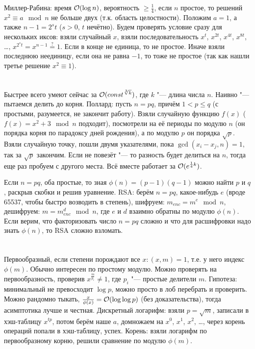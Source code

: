 Миллер-Рабина: время $\mathcal{O}(\log n)$, вероятность $\ge \frac 14$, если $n$ простое, то решений $x^2 \equiv a \mod n$ не больше двух (т.к. область целостности).
Положим $a=1$, а также $n-1 = 2^st$ ($s>0$, $t$ нечётно).
Будем проверять условие сразу для нескольких иксов: взяли случайный $x$, взяли последовательность $x^t$, $x^{2t}$, $x^{4t}$, $x^{8t}$, \dots, $x^{2^st}=x^{n-1}\stackrel{?}{=}1$.
Если в конце не единица, то не простое.
Иначе взяли последнюю неединицу, если она не равна $-1$, то тоже не простое (так как нашли третье решение $x^2\equiv 1$).

\section{} %
Быстрее всего умеют сейчас за $\mathcal{O}(const ^{\sqrt[3]{k}})$, где $k$ "--- длина числа $n$.
Наивно "--- пытаемся делить до корня.
Поллард: пусть $n=pq$, причём $1 < p \le q$ (с простыми, разумеется, не закончит работу).
Взяли случайную функцию $f(x)$ ($f(x)=x^2+3\mod n$ подходит), посмотрели на её периоды по модулю $n$ (он порядка корня по парадоксу дней рождения),
а по модулю $p$ он порядка $\sqrt p$.
Взяли случайную точку, пошли двумя указателями, пока $\gcd(x_i - x_j, n) = 1$, так за $\sqrt p$ закончим.
Если не повезёт "--- то разность будет делиться на $n$, тогда еще раз пробуем с другого места.
Всё вместе работает за $\mathcal{O}(e^{\frac14k})$.

Если $n=pq$, оба простые, то зная $\phi(n)=(p-1)(q-1)$ можно найти $p$ и $q$, раскрыв скобки и решив уравнение.
RSA: берём $n=pq$, какое-нибудь $e$ (вроде 65537, чтобы быстро возводить в степень), шифруем: $m_{enc}=m^e \mod n$,
дешифруем: $m=m_{enc}^d \mod n$, где $e$ и $d$ взаимно обратны по модулю $\phi(n)$.
Если верим, что факторизовать число $n=pq$ сложно и что для расшифровки надо знать $\phi(n)$, то RSA сложно взломать.

\section{} %
Первообразный, если степени порождают все $x \colon (x,m)=1$, т.е. у него индекс $\phi(m)$.
Обычно интересен по простому модулю.
Можно проверять на первообразность, проверив $x^{\frac{m}{p_i}} \neq 1$, где $p_i$ "--- простые делители $m$.
Гипотеза: минимальный не превосходит $\log p$, можно просто в лоб перебрать и проверить.
Можно рандомно тыкать, $\frac{x}{\phi(x)} = \mathcal{O}(\log \log p)$ (без доказательства), тогда асимптотика лучше и честная.
Дискретный логарифм: взяли $p=\sqrt m$, записали в хэш-таблицу $x^{tp}$, потом берём наше $a$, домножаем на $x^0$, $x^1$, $x^2$, \dots,
через корень операций попали в хэш-таблицу, успех.
Корень: взяли логарифм по первообразному корню, решили сравнение по модулю $\phi(m)$.

